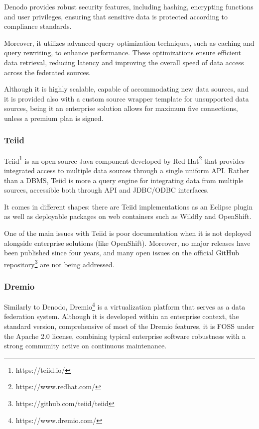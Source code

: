 Denodo provides robust security features, including hashing, encrypting functions and user privileges, ensuring that sensitive data is protected according to compliance standards.

Moreover, it utilizes advanced query optimization techniques, such as caching and query rewriting, to enhance performance. These optimizations ensure efficient data retrieval, reducing latency and improving the overall speed of data access across the federated sources.

Although it is highly scalable, capable of accommodating new data sources, and it is provided also with a custom source wrapper template for unsupported data sources, being it an enterprise solution allows for maximum five connections, unless a premium plan is signed.

\subsubsection{Teiid}
Teiid\footnote{https://teiid.io/} is an open-source Java component developed by Red Hat\footnote{https://www.redhat.com/} that provides integrated access to multiple data sources through a single uniform API. Rather than a \ac{DBMS}, Teiid is more a query engine for integrating data from multiple sources, accessible both through \ac{API} and \ac{JDBC}/\ac{ODBC} interfaces.

It comes in different shapes: there are Teiid implementations as an Eclipse plugin as well as deployable packages on web containers such as Wildfly and OpenShift.

One of the main issues with Teiid is poor documentation when it is not deployed alongside enterprise solutions (like OpenShift). Moreover, no major releases have been published since four years, and many open issues on the official GitHub repository\footnote{https://github.com/teiid/teiid} are not being addressed.

\subsubsection{Dremio}
Similarly to Denodo, Dremio\footnote{https://www.dremio.com/} is a virtualization platform that serves as a data federation system. Although it is developed within an enterprise context, the standard version, comprehensive of most of the Dremio features, it is \ac{FOSS} under the Apache 2.0 license, combining typical enterprise software robustness with a strong community active on continuous maintenance.

